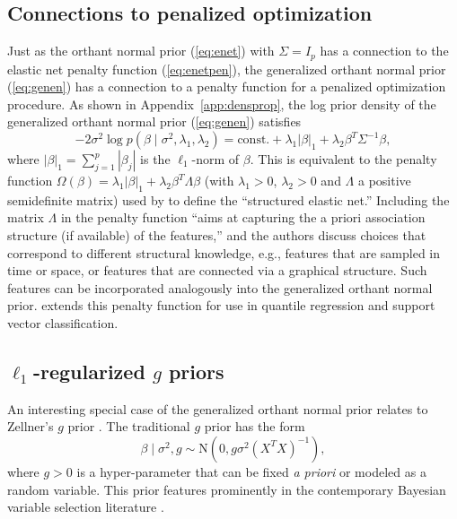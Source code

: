 \documentclass[12pt]{article}
\begin{document}
\subsection{Connections to penalized optimization}\label{sec:penop}
Just as the orthant normal prior (\ref{eq:enet}) with $\Sigma = I_p$ has a connection
to the elastic net penalty function (\ref{eq:enetpen}), the generalized orthant normal prior
(\ref{eq:genen}) has a connection to a penalty function for a penalized optimization procedure.
As shown in Appendix~\ref{app:densprop}, the log prior density of the generalized orthant normal 
prior (\ref{eq:genen}) satisfies
\begin{equation}
	-2\sigma^2 \log p(\beta \mid \sigma^2, \lambda_1, \lambda_2) = 
		\mbox{const.} + \lambda_1 | \beta |_1+ 
		\lambda_2 \beta^T \Sigma^{-1} \beta,
		\label{eq:genpen}
\end{equation}
where $| \beta |_1 = \sum_{j=1}^p |\beta_j|$ is the $\ell_1$-norm of $\beta$.  This is equivalent
to the penalty function $\Omega(\beta) = \lambda_1 |\beta |_1 + \lambda_2 \beta^T \Lambda \beta$ (with
$\lambda_1 > 0$, $\lambda_2 > 0$ and $\Lambda$ a positive semidefinite matrix)
used by \cite{slaw:10} to define the ``structured elastic net.''  Including the matrix $\Lambda$ 
in the penalty function ``aims at capturing the a priori association structure (if available) of the features,''
and the authors discuss choices that correspond to different structural knowledge, e.g., features that
are sampled in time or space, or features that are connected via a graphical structure. Such features
can be incorporated analogously into the generalized orthant normal prior.  \citet{slaw:12}
extends this penalty function for use in quantile regression and support vector classification.

\subsection{$\ell_1$-regularized $g$ priors}\label{sec:gpriors}
An interesting special case of the generalized orthant normal prior relates to Zellner's $g$ prior
\citep{zell:86}.
The traditional $g$ prior
has the form
\begin{equation}
	\beta \mid \sigma^2, g \sim \mbox{N}\left(0, g \sigma^2 (X^T X)^{-1}\right),
	\label{eq:gprior}
\end{equation}
where $g > 0$ is a hyper-parameter that can be fixed \emph{a priori} or 
modeled as a random variable.
This prior features prominently in the contemporary
Bayesian variable selection literature
\citep[e.g.][]{west:03, cui:08, lian:08, maru:11, baya:12, som:14}.
\end{document}
